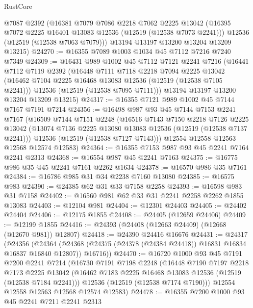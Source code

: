 \begin{lexlean}{RustCore}
\begin{coremodule}
      @7087
      @2392
      (@16381
        @7079
        @7086
        @2218
        @7062
        @2225
        @13042
        (@16395 @7072 @2225 @16401 @13083 @12536 (@12519 (@12538 @7073 @2241)))
        @12536
        (@12519 (@12538 @7063 @7079)))
      @13194
      @13197
      @13200
      @13204
      @13209
      @13215)
@24270 := @16355 @7089 @1003 @1034 @45 @7112 @7216 @7240 @7349
@24309 := @16431
    @989
    @1002
    @45
    @7112
    @7121
    @2241
    @7216
    (@16441
      @7112
      @7119
      @2392
      (@16448
        @7111
        @7118
        @2218
        @7094
        @2225
        @13042
        (@16462 @7104 @2225 @16468 @13083 @12536 (@12519 (@12538 @7105 @2241)))
        @12536
        (@12519 (@12538 @7095 @7111)))
      @13194
      @13197
      @13200
      @13204
      @13209
      @13215)
@24317 := @16355 @7121 @989 @1002 @45 @7144 @7167 @7191 @7214
@24356 := @16498
    @987
    @93
    @45
    @7144
    @7153
    @2241
    @7167
    (@16509
      @7144
      @7151
      @2248
      (@16516
        @7143
        @7150
        @2218
        @7126
        @2225
        @13042
        (@13074 @7136 @2225 @13080 @13083 @12536 (@12519 (@12538 @7137 @2241)))
        @12536
        (@12519 (@12538 @7127 @7143)))
      @12554
      @12558
      @12563
      @12568
      @12574
      @12583)
@24364 := @16355 @7153 @987 @93 @45 @2241 @7164 @2241 @2313
@24368 := @16554 @987 @45 @2241 @7163
@24375 := @16775 @986 @35 @45 @2241 @7161 @2262 @1634
@24378 := @16570 @986 @35 @7161
@24384 := @16786 @985 @31 @34 @2238 @7160 @13080
@24385 := @16575 @983
@24390 := @24385 @62 @31 @33 @7158 @2258
@24393 := @16598 @983 @31 @7158
@24402 := @16560 @981 @62 @33 @31 @2241 @2258 @2262 @1855 @13083
@24403 := @12104 @981
@24404 := @12301 @24403
@24405 := @24402 @24404
@24406 := @12175 @1855
@24408 := @24405 (@12659 @24406)
@24409 := @12199 @1855
@24416 := @24393 (@24408 (@12663 @24409) (@12668 (@12670 @981)) @12807)
@24418 := @24390 @24416 @16676
@24431 := @24317
    (@24356
      (@24364 (@24368 (@24375 (@24378 (@24384 @24418)) @16831 @16834 @16837 @16840 @12807)) @16716))
@24470 := @16720
    @1000
    @93
    @45
    @7191
    @7200
    @2241
    @7214
    (@16730
      @7191
      @7198
      @2248
      (@16448
        @7190
        @7197
        @2218
        @7173
        @2225
        @13042
        (@16462 @7183 @2225 @16468 @13083 @12536 (@12519 (@12538 @7184 @2241)))
        @12536
        (@12519 (@12538 @7174 @7190)))
      @12554
      @12558
      @12563
      @12568
      @12574
      @12583)
@24478 := @16355 @7200 @1000 @93 @45 @2241 @7211 @2241 @2313

\end{coremodule}
\end{lexlean}
